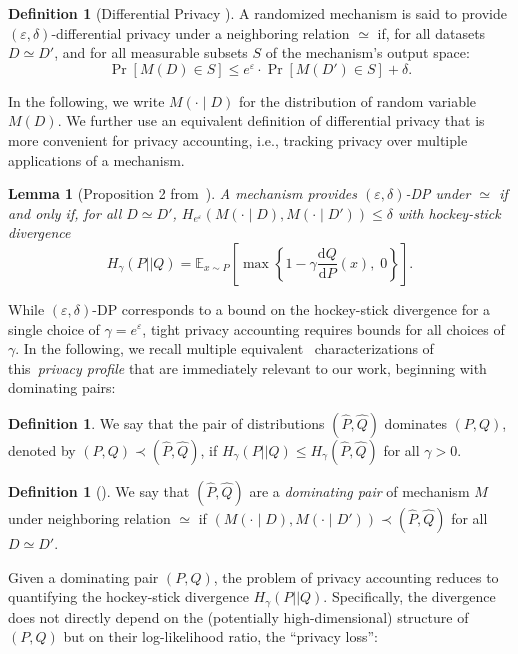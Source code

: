 \documentclass{article}
\theoremstyle{plain}
\newtheorem{lemma}[theorem]{Lemma}
\theoremstyle{definition}
\newtheorem{definition}[theorem]{Definition}
\theoremstyle{remark}
\renewcommand{\epsilon}{\varepsilon}
\newcommand{\dd}{\mathrm{d}}
\begin{document}
\begin{definition}[Differential Privacy \citep{dwork2006differential}]
A randomized mechanism is said to provide $(\varepsilon, \delta)$-differential privacy under a neighboring relation $\simeq$ if, for all datasets $D \simeq D'$, and for all measurable subsets $S$ of the mechanism's output space:
\begin{equation}
\Pr[M(D) \in S] \leq e^{\varepsilon} \cdot \Pr[M(D') \in S] + \delta.
\end{equation}
\end{definition}
In the following, we  write $M(\cdot \mid D)$ for the distribution of random variable $M(D)$.
We further use 
an equivalent definition of differential privacy that is more convenient for privacy accounting, i.e., tracking privacy over multiple applications of a mechanism.
\begin{lemma}[Proposition 2 from~\cite{barthe2013beyond}]
    A mechanism provides $(\epsilon, \delta)$-DP under $\simeq$ if and only if, for all $D \simeq D'$,
    $
        H_{e^\epsilon}\left(M(\cdot \mid D), M(\cdot \mid D')\right) \leq \delta
    $
    with hockey-stick divergence
    \begin{equation}\label{definition:hockey_stick_divergence}
        H_{\gamma}(P|| Q) = \mathbb{E}_{x \sim P} \left[ \max\left\{ 1 - \gamma \frac{\dd Q}{\dd P}(x),\; 0 \right\} \right].
    \end{equation}
\end{lemma}
While $(\epsilon,\delta)$-DP corresponds to a bound on the hockey-stick divergence for a single choice of 
$\gamma=e^\epsilon$, tight privacy accounting requires bounds for all choices of $\gamma$.
In the following, we recall multiple equivalent~\cite{zhu2022optimal} characterizations of this~\emph{privacy profile} that are immediately relevant to  our work, beginning with dominating pairs:
\begin{definition}
    We say that the pair of distributions $(\hat{P}, \hat{Q})$ dominates $(P,Q)$, denoted by $(P,Q) \prec (\hat{P},\hat{Q})$, 
    if $H_\gamma(P||Q) \leq H_\gamma(\hat{P},\hat{Q})$ for all $\gamma > 0$.
\end{definition}
\begin{definition}[\citet{zhu2022optimal}]
    We say that $(\hat{P}, \hat{Q})$ are a \emph{dominating pair} of mechanism $M$ under neighboring relation $\simeq$ if
    $(M(\cdot \mid D), M(\cdot \mid D')) \prec (\hat{P}, \hat{Q})$ for all $D \simeq D'$.
\end{definition}
Given a dominating pair $(P,Q)$, the problem of privacy accounting reduces to quantifying the hockey-stick divergence $H_\gamma(P||Q)$. Specifically, the divergence does not directly depend on the (potentially high-dimensional) structure of $(P, Q)$ but on their log-likelihood ratio, the ``privacy loss'':
\end{document}

